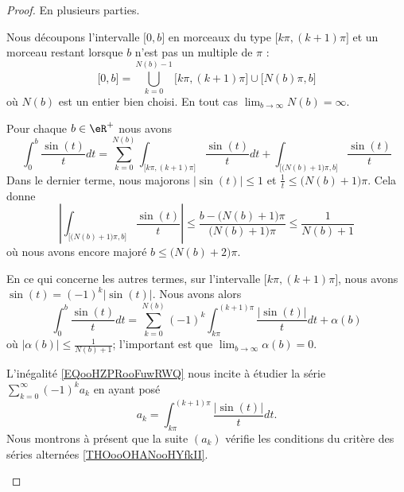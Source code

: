 \begin{proof}
	En plusieurs parties.
	\begin{subproof}
		\spitem[Découpage]

		Nous découpons l'intervalle \( \mathopen[ 0 , b \mathclose]\) en morceaux du type \( \mathopen[ k\pi , (k+1)\pi \mathclose]\) et un morceau restant lorsque \( b\) n'est pas un multiple de \( \pi\) :
		\begin{equation}
			\mathopen[ 0 , b \mathclose]=\bigcup_{k=0}^{N(b)-1}\mathopen[ k\pi , (k+1)\pi \mathclose]\cup\mathopen[ N(b)\pi , b \mathclose]
		\end{equation}
		où \( N(b)\) est un entier bien choisi. En tout cas \( \lim_{b\to \infty}N(b)=\infty\).

		\spitem[Majoration 1]

		Pour chaque \( b\in \eR^+\) nous avons
		\begin{equation}
			\int_0^b\frac{ \sin(t) }{ t }dt=\sum_{k=0}^{N(b)}\int_{\mathopen\big[ k\pi , (k+1)\pi \mathclose\big]}\frac{ \sin(t) }{ t }dt+\int_{\mathopen[ \big( N(b)+1 \big)\pi , b \mathclose]}\frac{ \sin(t) }{ t }
		\end{equation}
		Dans le dernier terme, nous majorons \( | \sin(t) |\leq 1\) et \( \frac{1}{ t }\leq \big( N(b)+1 \big)\pi\). Cela donne
		\begin{equation}
			\left|  \int_{\mathopen\big[ \big(N(b)+1\big)\pi  , b \mathclose\big]}\frac{ \sin(t) }{ t } \right|\leq \frac{ b-\big( N(b)+1 \big)\pi }{ \big( N(b)+1 \big)\pi }\leq \frac{1}{ N(b)+1 }
		\end{equation}
		où nous avons encore majoré \( b\leq \big( N(b)+2 \big)\pi\).

		\spitem[Majoration 2]

		En ce qui concerne les autres termes, sur l'intervalle \( \mathopen[ k\pi , (k+1)\pi \mathclose]\), nous avons \( \sin(t)=(-1)^k| \sin(t) |\). Nous avons alors
		\begin{equation}        \label{EQooHZPRooFuwRWQ}
			\int_0^b\frac{ \sin(t) }{ t }dt=\sum_{k=0}^{N(b)}(-1)^k\int_{k\pi}^{(k+1)\pi}\frac{ | \sin(t) | }{ t }dt+\alpha(b)
		\end{equation}
		où \( | \alpha(b) |\leq \frac{1}{ N(b)+1 }\); l'important est que \( \lim_{b\to \infty}\alpha(b)=0\).


		L'inégalité \eqref{EQooHZPRooFuwRWQ} nous incite à étudier la série \( \sum_{k=0}^{\infty}(-1)^ka_k\) en ayant posé
		\begin{equation}
			a_k=\int_{k\pi}^{(k+1)\pi}\frac{ | \sin(t) | }{ t }dt.
		\end{equation}
		Nous montrons à présent que la suite \( (a_k)\) vérifie les conditions du critère des séries alternées \ref{THOooOHANooHYfkII}.


\end{subproof}
\end{proof}
